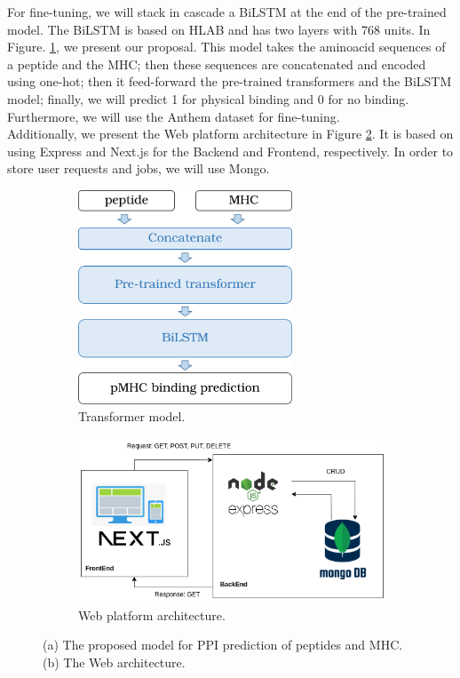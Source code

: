 \documentclass[a4paper,11pt]{article}
\begin{document}
For fine-tuning, we will stack in cascade a BiLSTM at the end of the pre-trained model. The BiLSTM is based on HLAB \cite{zhang2022hlab} and has two layers with 768 units. In Figure. \ref{fig:finetune}, we present our proposal. This model takes the aminoacid sequences of a peptide and the MHC; then these sequences are concatenated and encoded using one-hot; then it feed-forward the pre-trained transformers and the BiLSTM model; finally, we will predict 1 for physical binding and 0 for no binding. Furthermore, we will use the Anthem dataset \cite{mei2021anthem} for fine-tuning.\\

Additionally, we present the Web platform architecture in Figure \ref{fig:web}. It is based on using Express and Next.js for the Backend and Frontend, respectively. In order to store user requests and jobs, we will use Mongo.

\begin{figure}[h]
	\centering
	\begin{subfigure}[b]{0.4\textwidth}
		\centering
		\includegraphics[width=0.7\textwidth]{img/neoantigen/fine_tune2}
		\caption{Transformer model.}
		\label{fig:finetune}
	\end{subfigure}
	\hfill
	\begin{subfigure}[b]{0.56\textwidth}
		\centering
		\includegraphics[width=\textwidth]{img/neoantigen/web_arch}
		\caption{Web platform architecture.}
		\label{fig:web}
	\end{subfigure}
	
	\caption{(a) The proposed model for PPI prediction of peptides and MHC. (b) The Web architecture.}
	\label{fig:proposal}
\end{figure}
\end{document}
